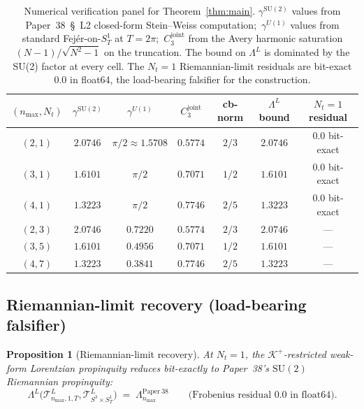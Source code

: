 \documentclass[11pt,a4paper]{article}
\theoremstyle{plain}
\newtheorem{proposition}[theorem]{Proposition}
\theoremstyle{definition}
\newcommand{\nmax}{n_{\max}}
\newcommand{\Nt}{N_{t}}
\newcommand{\SoneT}{S^{1}_{T}}
\newcommand{\Manifold}{S^{3}\times S^{1}_{T}}
\newcommand{\Krein}{\mathcal{K}}
\newcommand{\Tcal}{\mathcal{T}}
\newcommand{\SU}{\mathrm{SU}}
\newcommand{\Uone}{U(1)}
\newcommand{\Lprop}{\Lambda^{L}}
\newcommand{\Lambdab}{\Lambda}
\newcommand{\gammaSU}{\gamma^{\SU(2)}}
\newcommand{\gammaU}{\gamma^{\Uone}}
\newcommand{\Cthreejoint}{C_{3}^{\mathrm{joint}}}
\newcommand{\Kplus}{\Krein^{+}}
\begin{document}
\begin{table}[t]
\centering
\renewcommand{\arraystretch}{1.2}
\begin{tabular}{c|c|c|c|c|c|c}
\toprule
$(\nmax, \Nt)$ & $\gammaSU$ & $\gammaU$ & $\Cthreejoint$ & cb-norm
   & $\Lprop$ bound & $\Nt = 1$ residual \\
\midrule
$(2, 1)$ & $2.0746$ & $\pi/2 \approx 1.5708$  & $0.5774$ & $2/3$ & $2.0746$ & $\mathbf{0.0}$ bit-exact \\
$(3, 1)$ & $1.6101$ & $\pi/2$                  & $0.7071$ & $1/2$ & $1.6101$ & $\mathbf{0.0}$ bit-exact \\
$(4, 1)$ & $1.3223$ & $\pi/2$                  & $0.7746$ & $2/5$ & $1.3223$ & $\mathbf{0.0}$ bit-exact \\
$(2, 3)$ & $2.0746$ & $0.7220$                 & $0.5774$ & $2/3$ & $2.0746$ & --- \\
$(3, 5)$ & $1.6101$ & $0.4956$                 & $0.7071$ & $1/2$ & $1.6101$ & --- \\
$(4, 7)$ & $1.3223$ & $0.3841$                 & $0.7746$ & $2/5$ & $1.3223$ & --- \\
\bottomrule
\end{tabular}
\caption{Numerical verification panel for Theorem~\ref{thm:main}.
$\gammaSU$ values from Paper~38~\S~L2 closed-form Stein--Weiss
computation;\ $\gammaU$ values from standard Fej\'er-on-$\SoneT$ at
$T = 2\pi$;\ $\Cthreejoint$ from the Avery harmonic saturation
$(N-1)/\sqrt{N^{2}-1}$ on the truncation. The bound on $\Lprop$ is
dominated by the SU(2) factor at every cell. The $\Nt = 1$ Riemannian-limit
residuals are bit-exact $0.0$ in float64, the load-bearing falsifier
for the construction.}\label{tab:panel}
\end{table}

\subsection{Riemannian-limit recovery (load-bearing falsifier)}
\label{sec:riemannian_limit}

\begin{proposition}[Riemannian-limit recovery]\label{prop:riemannian_limit}
At $\Nt = 1$, the $\Kplus$-restricted weak-form Lorentzian propinquity
reduces bit-exactly to Paper~38's $\SU(2)$ Riemannian propinquity:
\begin{equation}\label{eq:riemannian_limit}
   \Lprop\!\bigl(\Tcal^{L}_{\nmax, 1, T}, \Tcal^{L}_{\Manifold}\bigr) \;=\; \Lambdab^{\mathrm{Paper~38}}_{\nmax}
   \qquad \text{(Frobenius residual $0.0$ in float64).}
\end{equation}
\end{proposition}
\end{document}
